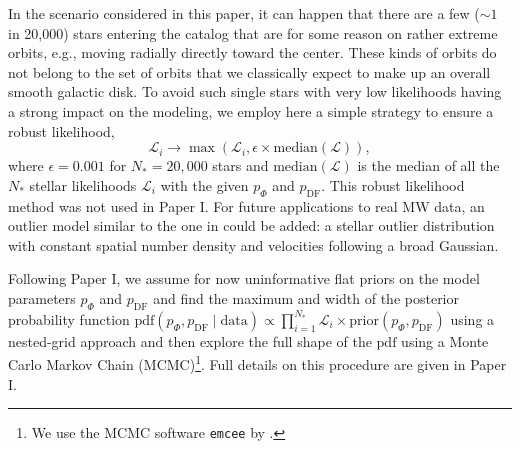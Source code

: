 \documentclass[iop,revtex4,numberedappendix,appendixfloats]{emulateapj}
\begin{document}
In the scenario considered in this paper, it can happen that there are a few ($\sim 1$ in 20,000) stars entering the catalog that are for some reason on rather extreme orbits, e.g., moving radially directly toward the center. These kinds of orbits do not belong to the set of orbits that we classically expect to make up an overall smooth galactic disk. To avoid such single stars with very low likelihoods having a strong impact on the modeling, we employ here a simple strategy to ensure a robust likelihood,
\begin{equation}
\mathscr{L}_i \longrightarrow \max \left( \mathscr{L}_i, \epsilon \times \text{median}(\mathscr{L})\right),
\end{equation}
where $\epsilon = 0.001$ for $N_*=20,000$ stars and $\text{median}(\mathscr{L})$ is the median of all the $N_*$ stellar likelihoods $\mathscr{L}_i$ with the given $p_\Phi$ and $p_\text{DF}$. This robust likelihood method was not used in Paper I. For future applications to real MW data, an outlier model similar to the one in \citet{2013ApJ...779..115B} could be added: a stellar outlier distribution with constant spatial number density and velocities following a broad Gaussian.

Following Paper I, we assume for now uninformative flat priors on the model parameters $p_\Phi$ and $p_\text{DF}$ and find the maximum and width of the posterior probability function $\text{pdf}(p_\Phi,p_\text{DF} \mid \text{data}) \propto \prod_{i=1}^{N_*} \mathscr{L}_i \times \text{prior}(p_\Phi,p_\text{DF})$ using a nested-grid approach and then explore the full shape of the $\text{pdf}$ using a Monte Carlo Markov Chain (MCMC)\footnote{We use the MCMC software \texttt{\texttt{emcee}} by \citet{2013PASP..125..306F}.}. Full details on this procedure are given in Paper I.
\end{document}

